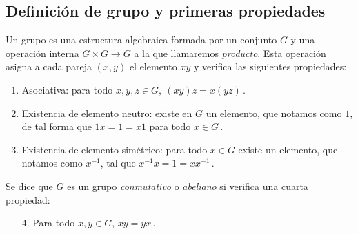 \subsection{Definición de grupo y primeras propiedades}

\begin{ndef}
Un grupo es una estructura algebraica formada por un conjunto $G$ y una operación interna 
$G \times G \to G$ a la que llamaremos \textit{producto}. Esta operación asigna a cada pareja $(x,y)$ el elemento $xy$ y verifica las siguientes propiedades:
\begin{enumerate}
  \item Asociativa: para todo $x,y,z \in G, \ (xy)z = x(yz)\,.$
  \item Existencia de elemento neutro: existe en $G$ un elemento, que notamos como $1$, de tal forma que  $1x = 1 = x1$ para todo $x \in G$\,.
  \item Existencia de elemento simétrico: para todo $x \in G$ existe un elemento, que notamos como $x^{-1}$, tal que $x^{-1}x = 1 = xx^{-1}$\,.
\end{enumerate}
Se dice que $G$ es un grupo \textit{conmutativo} o \textit{abeliano} si verifica una cuarta propiedad: \begin{enumerate}
  \item[4.] Para todo $x, y \in G$, $xy = yx$\,.
\end{enumerate}

\end{ndef}

